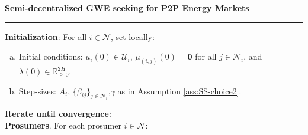 \documentclass[10pt]{article}
\newcommand{\mc}{\mathcal}
\newcommand{\bb}{\mathbb}
\newcommand{\R}{\bb R}
\newcommand{\0}{\mathbf{0}}
\newcommand{\1}{\mathbf{1}}
\begin{document}
\smallskip
\textbf{Semi-decentralized GWE seeking for P2P Energy Markets}

\smallskip
\hrule
	
	\medskip
	\noindent
	\textbf{Initialization}:
	For all $ i \in \mc N$, set locally:
	\begin{enumerate}[(a)]
		\item Initial conditions: $u_i(0) \in \mc U_i$, $\mu_{(i,j)}(0) = \0$ for all $ j \in \mc N_i$, and $\lambda(0) \in \R^{2H}_{\geq 0}$.
		
		\item Step-sizes:
$A_i$, $\{\beta_{ij}\}_{j \in \mc N_i}$,$\gamma$ as in Assumption \ref{ass:SS-choice2}.

	\end{enumerate}
	
	
	\medskip
	\noindent
	\textbf{Iterate until convergence}:\\[1em]
\textbf{Prosumers}. For each prosumer $i \in \mc N$:
\end{document}
